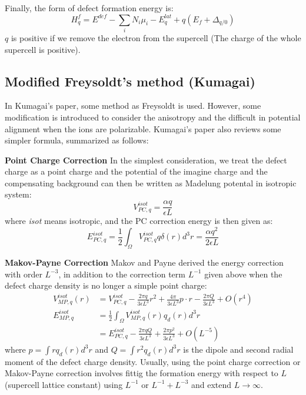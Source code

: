 \documentclass{article}
\begin{document}
Finally, the form of defect formation energy is:
\begin{equation}
    H^{f}_q = E^{def} - \sum_i N_i \mu_i - E^{lat}_q + q(E_f + \Delta_{q/0})
\end{equation}
$q$ is positive if we remove the electron from the supercell (The charge of the whole supercell is positive).

\subsection*{Modified Freysoldt's method (Kumagai)}
In Kumagai's paper, some method as Freysoldt is used. However, some modification is introduced 
to consider the anisotropy and the difficult in potential alignment when the ions are polarizable.
Kumagai's paper also reviews some simpler formula, summarized as follows:

\textbf{Point Charge Correction} In the simplest consideration, we treat the defect charge as a point charge
and the potential of the imagine charge and the compensating background can then be written as Madelung 
potental in isotropic system:
\begin{equation}
    V_{PC,q}^{isot} = \frac{\alpha q}{\epsilon L}
\end{equation}
where \emph{isot} means isotropic, and the PC correction energy is then given as:
\begin{equation}
    E_{PC,q}^{isot} = \frac{1}{2}\int_{\Omega} V_{PC,q}^{isot} q \delta(r) d^3r = \frac{\alpha q^2}{2 \epsilon L}
\end{equation}

\textbf{Makov-Payne Correction} Makov and Payne derived the energy correction with order $L^{-3}$, in addition to the 
correction term $L^{-1}$ given above when the defect charge density is no longer a simple point charge:
\begin{align}
    V_{MP,q}^{isot}(r) &=  V_{PC,q}^{isot} - \frac{2\pi q}{3 \epsilon L^3} r^2 + \frac{4\pi}{3 \epsilon L^3} p \cdot r - \frac{2\pi Q}{3 \epsilon L^3} + O(r^4) \\
    E_{MP,q}^{isot} &= \frac{1}{2}\int_{\Omega} V_{MP,q}^{isot}(r) q_d(r) d^3r \\
        &= E_{PC,q}^{isot} - \frac{2\pi q Q}{3 \epsilon L^3} + \frac{2\pi p^2}{3\epsilon L^3} + O(L^{-5})
\end{align} 
where $p = \int r q_d(r) d^3r$ and $Q = \int r^2 q_d(r) d^3 r$ is the dipole and second radial moment of the defect charge density. Usually, 
using the point charge correction or Makov-Payne correction involves fittig the formation energy with respect to $L$ (supercell lattice constant)
using $L^{-1}$ or $L^{-1} + L^{-3}$ and extend $L \to \infty$.
\end{document}
